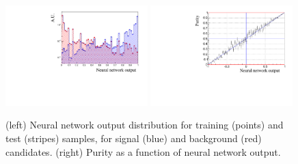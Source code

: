 \begin{figure}
\centering
\includegraphics[width=0.49\textwidth]{Lmumu/figs/TrainAndTest.pdf}
\includegraphics[width=0.49\textwidth]{Lmumu/figs/purity_NN.pdf}
\caption{(left) Neural network output distribution for training (points) and test (stripes) samples,
for signal (blue) and background (red) candidates. (right) Purity as a function of neural network output.}
\label{fig:Lb_nnDist}
\end{figure}

